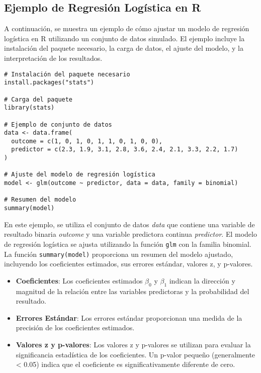 \subsection*{Ejemplo de Regresión Logística en R}

A continuación, se muestra un ejemplo de cómo ajustar un modelo de regresión logística en R utilizando un conjunto de datos simulado. El ejemplo incluye la instalación del paquete necesario, la carga de datos, el ajuste del modelo, y la interpretación de los resultados.

\begin{verbatim}
# Instalación del paquete necesario
install.packages("stats")

# Carga del paquete
library(stats)

# Ejemplo de conjunto de datos
data <- data.frame(
  outcome = c(1, 0, 1, 0, 1, 1, 0, 1, 0, 0),
  predictor = c(2.3, 1.9, 3.1, 2.8, 3.6, 2.4, 2.1, 3.3, 2.2, 1.7)
)

# Ajuste del modelo de regresión logística
model <- glm(outcome ~ predictor, data = data, family = binomial)

# Resumen del modelo
summary(model)
\end{verbatim}

En este ejemplo, se utiliza el conjunto de datos \textit{data} que contiene una variable de resultado binaria \textit{outcome} y una variable predictora continua \textit{predictor}. El modelo de regresión logística se ajusta utilizando la función \texttt{glm} con la familia binomial. La función \texttt{summary(model)} proporciona un resumen del modelo ajustado, incluyendo los coeficientes estimados, sus errores estándar, valores z, y p-valores.

\begin{itemize}
    \item \textbf{Coeficientes}: Los coeficientes estimados $\beta_0$ y $\beta_1$ indican la dirección y magnitud de la relación entre las variables predictoras y la probabilidad del resultado.
    \item \textbf{Errores Estándar}: Los errores estándar proporcionan una medida de la precisión de los coeficientes estimados.
    \item \textbf{Valores z y p-valores}: Los valores z y p-valores se utilizan para evaluar la significancia estadística de los coeficientes. Un p-valor pequeño (generalmente < 0.05) indica que el coeficiente es significativamente diferente de cero.
\end{itemize}


